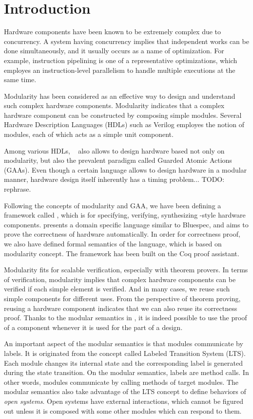 \chapter{Introduction}

Hardware components have been known to be extremely complex due to
concurrency. A system having concurrency implies that independent
works can be done simultaneously, and it usually occurs as a name of
optimization. For example, instruction pipelining is one of a
representative optimizations, which employes an instruction-level
parallelism to handle multiple executions at the same time.

Modularity has been considered as an effective way to design and
understand such complex hardware components. Modularity indicates that
a complex hardware component can be constructed by composing simple
modules. Several Hardware Description Languages (HDLs) such as Verilog
employes the notion of modules, each of which acts as a simple unit
component.

Among various HDLs, \Bluespec{}~\cite{bsdef, bsref} also allows to
design hardware based not only on modularity, but also the prevalent
paradigm called Guarded Atomic Actions (GAAs). Even though a certain
language allows to design hardware in a modular manner, hardware
design itself inherently has a timing problem... TODO: rephrase.

Following the concepts of modularity and GAA, we have been defining a
framework called \Kami{}, which is for specifying, verifying,
synthesizing \Bluespec{}-style hardware components. \Kami{} presents a
domain specific language similar to Bluespec, and aims to prove the
correctness of hardware automatically. In order for correctness proof,
we also have defined formal semantics of the \Kami{} language, which
is based on modularity concept. The framework has been built on the
Coq proof assistant.

Modularity fits for scalable verification, especially with theorem
provers. In terms of verification, modularity implies that complex
hardware components can be verified if each simple element is
verified. And in many cases, we reuse such simple components for
different uses. From the perspective of theorem proving, reusing a
hardware component indicates that we can also reuse its correctness
proof. Thanks to the modular semantics in \Kami{}, it is indeed
possible to use the proof of a component whenever it is used for the
part of a design.

An important aspect of the modular semantics is that modules
communicate by labels. It is originated from the concept called
Labeled Transition System (LTS). Each module changes its internal
state and the corresponding label is generated during the state
transition. On the modular semantics, labels are method calls. In
other words, modules communicate by calling methods of target modules.
The modular semantics also take advantage of the LTS concept to define
behaviors of \emph{open systems}. Open systems have external
interactions, which cannot be figured out unless it is composed with
some other modules which can respond to them.

